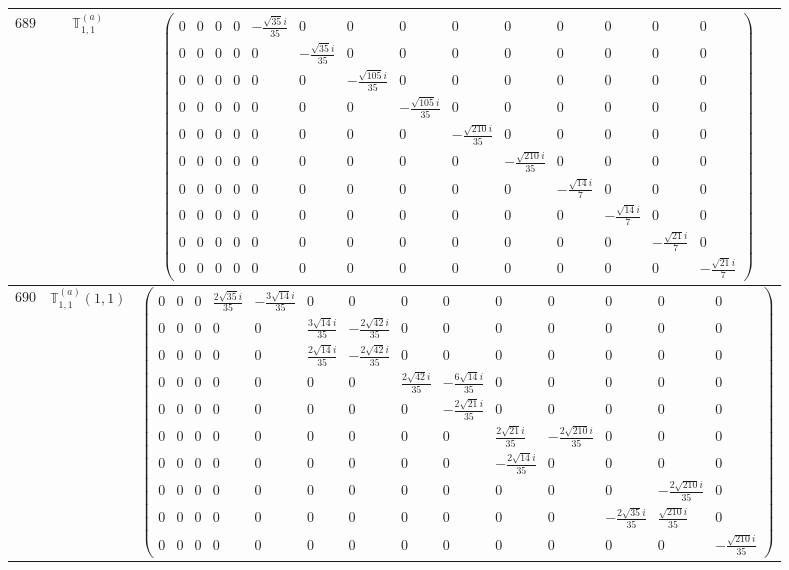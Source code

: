 \documentclass[fleqn,8pt,landscape]{jsarticle}
\begin{document}
\begin{center}
\begin{longtable}{ccc}
$ 689 $ & $ \mathbb{T}_{1,1}^{(a)} $ & $ \begin{pmatrix} 0 & 0 & 0 & 0 & - \frac{\sqrt{35} i}{35} & 0 & 0 & 0 & 0 & 0 & 0 & 0 & 0 & 0 \\ 0 & 0 & 0 & 0 & 0 & - \frac{\sqrt{35} i}{35} & 0 & 0 & 0 & 0 & 0 & 0 & 0 & 0 \\ 0 & 0 & 0 & 0 & 0 & 0 & - \frac{\sqrt{105} i}{35} & 0 & 0 & 0 & 0 & 0 & 0 & 0 \\ 0 & 0 & 0 & 0 & 0 & 0 & 0 & - \frac{\sqrt{105} i}{35} & 0 & 0 & 0 & 0 & 0 & 0 \\ 0 & 0 & 0 & 0 & 0 & 0 & 0 & 0 & - \frac{\sqrt{210} i}{35} & 0 & 0 & 0 & 0 & 0 \\ 0 & 0 & 0 & 0 & 0 & 0 & 0 & 0 & 0 & - \frac{\sqrt{210} i}{35} & 0 & 0 & 0 & 0 \\ 0 & 0 & 0 & 0 & 0 & 0 & 0 & 0 & 0 & 0 & - \frac{\sqrt{14} i}{7} & 0 & 0 & 0 \\ 0 & 0 & 0 & 0 & 0 & 0 & 0 & 0 & 0 & 0 & 0 & - \frac{\sqrt{14} i}{7} & 0 & 0 \\ 0 & 0 & 0 & 0 & 0 & 0 & 0 & 0 & 0 & 0 & 0 & 0 & - \frac{\sqrt{21} i}{7} & 0 \\ 0 & 0 & 0 & 0 & 0 & 0 & 0 & 0 & 0 & 0 & 0 & 0 & 0 & - \frac{\sqrt{21} i}{7} \end{pmatrix} $ \\ \hline
$ 690 $ & $ \mathbb{T}_{1,1}^{(a)}(1,1) $ & $ \begin{pmatrix} 0 & 0 & 0 & \frac{2 \sqrt{35} i}{35} & - \frac{3 \sqrt{14} i}{35} & 0 & 0 & 0 & 0 & 0 & 0 & 0 & 0 & 0 \\ 0 & 0 & 0 & 0 & 0 & \frac{3 \sqrt{14} i}{35} & - \frac{2 \sqrt{42} i}{35} & 0 & 0 & 0 & 0 & 0 & 0 & 0 \\ 0 & 0 & 0 & 0 & 0 & \frac{2 \sqrt{14} i}{35} & - \frac{2 \sqrt{42} i}{35} & 0 & 0 & 0 & 0 & 0 & 0 & 0 \\ 0 & 0 & 0 & 0 & 0 & 0 & 0 & \frac{2 \sqrt{42} i}{35} & - \frac{6 \sqrt{14} i}{35} & 0 & 0 & 0 & 0 & 0 \\ 0 & 0 & 0 & 0 & 0 & 0 & 0 & 0 & - \frac{2 \sqrt{21} i}{35} & 0 & 0 & 0 & 0 & 0 \\ 0 & 0 & 0 & 0 & 0 & 0 & 0 & 0 & 0 & \frac{2 \sqrt{21} i}{35} & - \frac{2 \sqrt{210} i}{35} & 0 & 0 & 0 \\ 0 & 0 & 0 & 0 & 0 & 0 & 0 & 0 & 0 & - \frac{2 \sqrt{14} i}{35} & 0 & 0 & 0 & 0 \\ 0 & 0 & 0 & 0 & 0 & 0 & 0 & 0 & 0 & 0 & 0 & 0 & - \frac{2 \sqrt{210} i}{35} & 0 \\ 0 & 0 & 0 & 0 & 0 & 0 & 0 & 0 & 0 & 0 & 0 & - \frac{2 \sqrt{35} i}{35} & \frac{\sqrt{210} i}{35} & 0 \\ 0 & 0 & 0 & 0 & 0 & 0 & 0 & 0 & 0 & 0 & 0 & 0 & 0 & - \frac{\sqrt{210} i}{35} \end{pmatrix} $ \\ \hline

\end{longtable}
\end{center}
\end{document}
